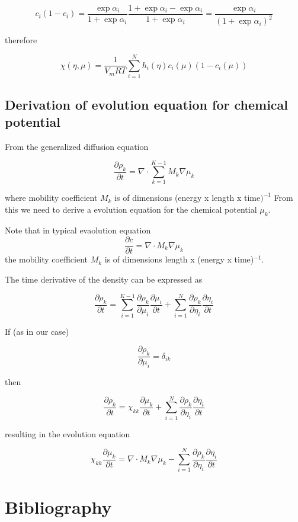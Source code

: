 \documentclass[11pt]{article}
\begin{document}
$$
c_i (1-c_i) = \frac{\exp{\alpha_i}}{1+\exp{\alpha_i}} \frac{1+\exp{\alpha_i} - \exp{\alpha_i}}{1+\exp{\alpha_i}} = \frac{\exp{\alpha_i}}{(1+\exp{\alpha_i})^2}
$$

therefore

$$
\chi(\eta, \mu) = \frac{1}{V_m R T} \sum_{i=1}^N h_i(\eta) c_i(\mu) (1-c_i(\mu))
$$




\subsection{Derivation of evolution equation for chemical potential}
\label{sec:org667b947}

From the generalized diffusion equation

$$
\frac{\partial \rho_k}{\partial t} = \nabla \cdot \sum_{k=1}^{K-1} M_k \nabla \mu_k
$$

where mobility coefficient \(M_k\) is of dimensions (energy x length x time\()^{-1}\)
From this we need to derive a evolution equation for the chemical potential \(\mu_k\).

Note that in typical evaolution equation
$$
\frac{\partial c}{\partial t} = \nabla \cdot M_k \nabla \mu_k
$$
the mobility coefficient \(M_k\) is of dimensions length x (energy x time)\(^{-1}\).

The time derivative of the density can be expressed as

$$
\frac{\partial \rho_k}{\partial t} = \sum_{i=1}^{K-1} \frac{\partial \rho_k}{\partial \mu_i} \frac{\partial \mu_i}{\partial t} + \sum_{i=1}^{N} \frac{\partial \rho_k}{\partial \eta_i} \frac{\partial \eta_i}{\partial t}
$$

If (as in our case)

$$
\frac{\partial \rho_k}{\partial \mu_i} = \delta_{ik}
$$

then

$$
\frac{\partial \rho_k}{\partial t} = \chi_{kk} \frac{\partial \mu_k}{\partial t} + \sum_{i=1}^{N} \frac{\partial \rho_k}{\partial \eta_i} \frac{\partial \eta_i}{\partial t}
$$

resulting in the evolution equation

$$
\chi_{kk} \frac{\partial \mu_k}{\partial t} = \nabla \cdot M_k \nabla \mu_k - \sum_{i=1}^N \frac{\partial \rho_k}{\partial \eta_i} \frac{\partial \eta_i}{\partial t}
$$



\section{Bibliography}
\label{sec:org98c8b83}
\end{document}
